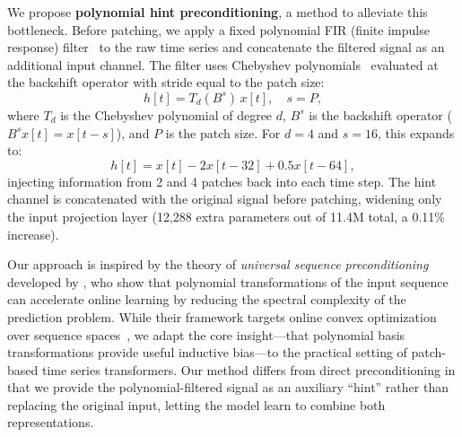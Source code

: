 \documentclass[11pt]{article}
\begin{document}
We propose \textbf{polynomial hint preconditioning}, a method to alleviate this bottleneck. Before patching, we apply a fixed polynomial FIR (finite impulse response) filter~\citep{oppenheim1999discrete} to the raw time series and concatenate the filtered signal as an additional input channel. The filter uses Chebyshev polynomials~\citep{mason2003chebyshev} evaluated at the backshift operator with stride equal to the patch size:
\begin{equation}
h[t] = T_d(B^s) \, x[t], \quad s = P,
\label{eq:hint}
\end{equation}
where $T_d$ is the Chebyshev polynomial of degree $d$, $B^s$ is the backshift operator ($B^s x[t] = x[t-s]$), and $P$ is the patch size. For $d=4$ and $s=16$, this expands to:
\begin{equation}
h[t] = x[t] - 2 x[t-32] + 0.5 x[t-64],
\end{equation}
injecting information from 2 and 4 patches back into each time step. The hint channel is concatenated with the original signal before patching, widening only the input projection layer (12,288 extra parameters out of 11.4M total, a 0.11\% increase).

Our approach is inspired by the theory of \emph{universal sequence preconditioning} developed by \citet{marsden2024universal}, who show that polynomial transformations of the input sequence can accelerate online learning by reducing the spectral complexity of the prediction problem. While their framework targets online convex optimization over sequence spaces~\citep{hazan2016introduction}, we adapt the core insight---that polynomial basis transformations provide useful inductive bias---to the practical setting of patch-based time series transformers. Our method differs from direct preconditioning in that we provide the polynomial-filtered signal as an auxiliary ``hint'' rather than replacing the original input, letting the model learn to combine both representations.
\end{document}
